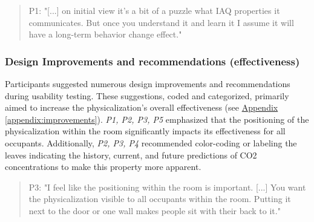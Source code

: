 \begin{quote}
P1: "[...] on initial view it's a bit of a puzzle what IAQ properties it communicates. But once you understand it and learn it I assume it will have a long-term behavior change effect."
\end{quote}


\subsubsection{Design Improvements and recommendations (effectiveness)}

Participants suggested numerous design improvements and recommendations during usability testing. These suggestions, coded and categorized, primarily aimed to increase the physicalization's overall effectiveness (see \hyperref[appendix:improvements]{Appendix \ref*{appendix:improvements}}). \textit{P1, P2, P3, P5} emphasized that the positioning of the physicalization within the room significantly impacts its effectiveness for all occupants. Additionally, \textit{P2, P3, P4} recommended color-coding or labeling the leaves indicating the history, current, and future predictions of CO2 concentrations to make this property more apparent.

\begin{quote}
P3: "I feel like the positioning within the room is important. [...] You want the physicalization visible to all occupants within the room. Putting it next to the door or one wall makes people sit with their back to it."
\end{quote}